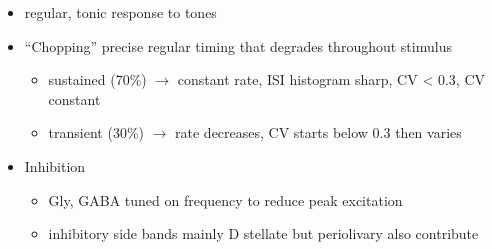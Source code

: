 \begin{itemize}
\item regular, tonic response to tones \citep{RhodeOertelEtAl:1983,SmithRhode:1989,BlackburnSachs:1989}
\item ``Chopping'' precise regular timing that degrades throughout stimulus\citep{YoungRobertEtAl:1988,BlackburnSachs:1989}
\begin{itemize}
\item sustained (70\%) $\rightarrow$ constant rate, ISI histogram sharp, CV < 0.3, CV constant
\item transient (30\%) $\rightarrow$ rate decreases, CV starts below 0.3 then varies
\end{itemize}
\item Inhibition
\begin{itemize}
\item Gly, GABA tuned on frequency to reduce peak excitation \citep{CasparyBackoffEtAl:1994}
\item inhibitory side bands mainly D stellate \citep{FerragamoGoldingEtAl:1998a} but periolivary also contribute \citep{AdamsWarr:1976,Adams:1983,ShoreHelfertEtAl:1991,OstapoffBensonEtAl:1997}
\end{itemize}
\end{itemize}
\citep{PalombiCaspary:1992,RhodeSmith:1986,NelkenYoung:1994,PaoliniClareyEtAl:2005,PaoliniClareyEtAl:2004}  

